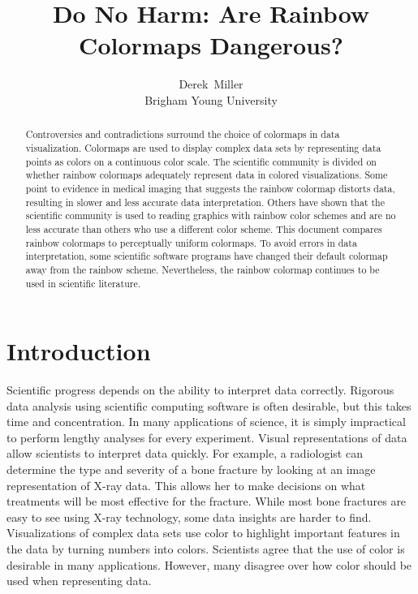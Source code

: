 \documentclass[journal,12pt]{IEEEtran}
\title{Do No Harm: Are Rainbow Colormaps Dangerous? \\}
\author{Derek~Miller \\ Brigham Young University}%
\begin{document}
\begin{titlepage}
\maketitle
\thispagestyle{empty}

\begin{abstract}
Controversies and contradictions
surround the choice of colormaps in data visualization.
Colormaps are used to display complex data sets by
representing data points as colors on a continuous color scale. The scientific
community is divided on whether rainbow colormaps
adequately represent data in colored visualizations. Some point to evidence in medical imaging
that suggests the rainbow colormap distorts data, resulting in slower and 
less accurate data interpretation. Others have shown that the
scientific community is used to reading graphics with rainbow
color schemes and are no less accurate than others who use
a different color scheme. This document compares rainbow colormaps
to perceptually uniform colormaps.
To avoid errors in data interpretation, some scientific software programs
have changed their default colormap away from the rainbow scheme.
Nevertheless, the rainbow colormap
continues to be used in scientific literature.
\end{abstract}
\tableofcontents
\vspace*{\fill}
\end{titlepage}

\IEEEpeerreviewmaketitle

\section{Introduction}

Scientific progress depends on the ability to interpret data correctly. Rigorous data analysis
using scientific computing software is often desirable, but this takes time and concentration.
In many applications of science, it is simply impractical to perform lengthy analyses for every
experiment. Visual representations of data
allow scientists to interpret data quickly.
For example, a radiologist can determine the
type and severity of a bone fracture by looking at an
image representation of X-ray data. This allows her to make decisions on what treatments will be most effective
for the fracture. While most bone fractures are easy to see using X-ray technology, some data insights are
harder to find. Visualizations of complex data sets use color to highlight important features
in the data by turning numbers into colors. Scientists agree that the use of color is desirable in many applications.
However, many disagree over how color should be used when representing data.
\end{document}
